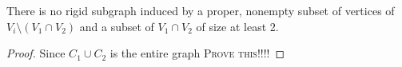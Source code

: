 \documentclass[11pt]{article}
\newcommand{\todo}[1]{\textsc{{\color{red}#1}}}
\begin{document}







\begin{corollary}
There is no rigid subgraph induced by a proper, nonempty subset of vertices of $V_i \setminus (V_1\cap V_2)$ and a subset of $V_1\cap V_2$ of size at least 2.
\end{corollary}

\begin{proof}
Since $C_1\cup C_2$ is the entire graph
\todo{Prove this!!!!}
\end{proof}






\end{document}
